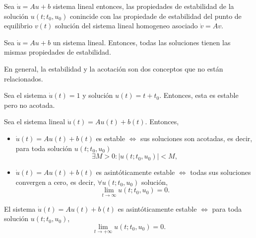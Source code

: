 \begin{prop}
   Sea $\dot{u} = Au + b$ sistema lineal entonces, las propiedades de estabilidad de la solución $u(t; t_0, u_0)$ conincide con las propiedade de estabilidad del punto de equilibrio $v(t)$ solución del sistema lineal homogeneo asociado $\dot{v} = Av$.
\end{prop}

\begin{theo}
  Sea $\dot{u} = Au + b$ un sistema lineal. Entonces, todas las soluciones tienen las mismas propiedades de estabilidad.
\end{theo}

\begin{obs}
  En general, la estabilidad y la acotación son dos conceptos que no están relacionados.
\end{obs}

\begin{ejm}
  Sea el sistema $\dot{u}(t) = 1$ y solución $u(t) = t + t_{0}$. Entonces, esta es estable pero no acotada.
\end{ejm}

\begin{theo}
  Sea el sistema lineal $\dot{{u}}(t) = Au(t) + b(t)$. Entonces,
  \begin{itemize}
    \item $\dot{{u}}(t) = Au(t) + b(t)$ es estable $\Leftrightarrow$ sus soluciones son acotadas, es decir, para toda solución $u(t; t_0, u_0)$
      \[ 
        \exists M > 0 : | u(t; t_0, u_0) | < M, 
      \] 
    \item $\dot{{u}}(t) = Au(t) + b(t)$ es asintóticamente estable $\Leftrightarrow$ todas sus soluciones convergen a cero, es decir, $\forall u(t; t_0, u_0)$ solución,
      \[ 
        \lim_{t \to \infty} u(t; t_0, u_0) = 0 .
      \] 
  \end{itemize}
\end{theo}

\begin{prop}
  El sistema $\dot{{u}}(t) = Au(t) + b(t)$ es asintóticamente estable $\Leftrightarrow$ para toda solución $u(t; t_0, u_0)$,
  \[ 
    \lim_{t \to +\infty} u(t; t_0, u_0) = 0.
  \] 
\end{prop}

